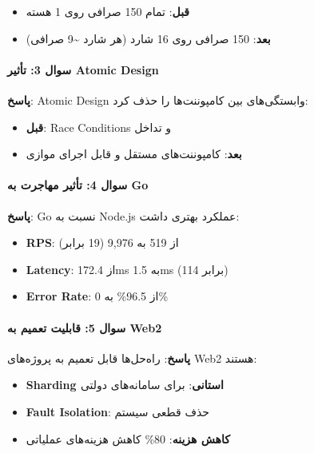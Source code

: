 \documentclass[
]{article}
\providecommand{\tightlist}{%
  \setlength{\itemsep}{0pt}\setlength{\parskip}{0pt}}
\begin{document}
\begin{itemize}
\tightlist
\item
  \textbf{قبل}: تمام 150 صرافی روی 1 هسته
\item
  \textbf{بعد}: 150 صرافی روی 16 شارد (هر شارد \textasciitilde9 صرافی)
\end{itemize}

\paragraph{سوال 3: تأثیر Atomic
Design}\label{ux633ux648ux627ux644-3-ux62aux623ux62bux6ccux631-atomic-design}

\textbf{پاسخ}: Atomic Design وابستگی‌های بین کامپوننت‌ها را حذف کرد:

\begin{itemize}
\tightlist
\item
  \textbf{قبل}: Race Conditions و تداخل
\item
  \textbf{بعد}: کامپوننت‌های مستقل و قابل اجرای موازی
\end{itemize}

\paragraph{سوال 4: تأثیر مهاجرت به
Go}\label{ux633ux648ux627ux644-4-ux62aux623ux62bux6ccux631-ux645ux647ux627ux62cux631ux62a-ux628ux647-go}

\textbf{پاسخ}: Go نسبت به Node.js عملکرد بهتری داشت:

\begin{itemize}
\tightlist
\item
  \textbf{RPS}: از 519 به 9,976 (19 برابر)
\item
  \textbf{Latency}: از 172.4ms به 1.5ms (114 برابر)
\item
  \textbf{Error Rate}: از 96.5\% به 0\%
\end{itemize}

\paragraph{سوال 5: قابلیت تعمیم به
Web2}\label{ux633ux648ux627ux644-5-ux642ux627ux628ux644ux6ccux62a-ux62aux639ux645ux6ccux645-ux628ux647-web2}

\textbf{پاسخ}: راه‌حل‌ها قابل تعمیم به پروژه‌های Web2 هستند:

\begin{itemize}
\tightlist
\item
  \textbf{Sharding استانی}: برای سامانه‌های دولتی
\item
  \textbf{Fault Isolation}: حذف قطعی سیستم
\item
  \textbf{کاهش هزینه}: 80\% کاهش هزینه‌های عملیاتی
\end{itemize}
\end{document}
